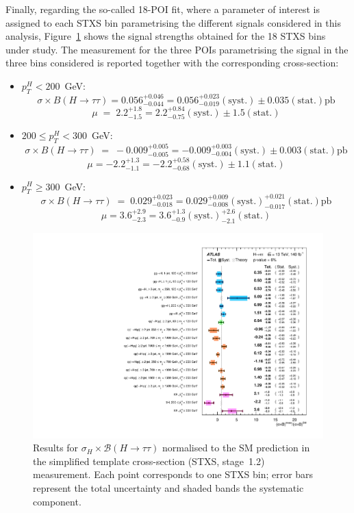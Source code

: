 Finally, regarding the so-called 18-POI fit, where a parameter of interest is assigned to each STXS bin parametrising the different signals considered in this \htautau analysis, Figure~\ref{fig:stxs_mu} shows the signal strengths obtained for the 18 STXS bins under study. The measurement for the three POIs parametrising the \ttH signal in the three \pth bins considered is reported together with the corresponding cross-section:
\begin{itemize}
  \small
  \item $p_{T}^{H} < 200$~GeV:  
  \[
  \sigma \times B(H \to \tau\tau)=0.056^{+0.046}_{-0.044} 
  = 0.056^{+0.023}_{-0.019}(\text{syst.})\pm 0.035(\text{stat.})\text{pb}
  \]
  \[
  \mu \;=\; 2.2^{+1.8}_{-1.5}=2.2^{+0.84}_{-0.75}(\text{syst.})\pm 1.5(\text{stat.})
  \]
  \item $200 \leq p_{T}^{H} < 300$~GeV:  
  \[
  \sigma \times B(H \to \tau\tau) \;=\; -0.009^{+0.005}_{-0.005} 
  = -0.009^{+0.003}_{-0.004}(\text{syst.})\pm 0.003(\text{stat.}) \text{pb}
  \]
  \[
  \mu=-2.2^{+1.3}_{-1.1}=-2.2^{+0.58}_{-0.68}(\text{syst.})\pm 1.1(\text{stat.})
  \]
  \item $p_{T}^{H} \geq 300$~GeV:  
  \[
  \sigma \times B(H \to \tau\tau) \;=\; 0.029^{+0.023}_{-0.018} 
  = 0.029^{+0.009}_{-0.008}(\text{syst.})^{+0.021}_{-0.017}(\text{stat.})\text{pb}
  \]
  \[
  \mu=3.6^{+2.9}_{-2.3}=3.6^{+1.3}_{-0.9}(\text{syst.})^{+2.6}_{-2.1}(\text{stat.})
  \]
\end{itemize}

\begin{figure}[htbp]
  \centering
  \includegraphics[width=0.92\linewidth]{images/fit_stxs/fig_06.pdf} %
  \caption{Results for \(\sigma_H \times \mathcal{B}(H\!\to\!\tau\tau)\) normalised to the SM prediction
  in the simplified template cross-section (STXS, stage~1.2) measurement.
  Each point corresponds to one STXS bin; error bars represent the total uncertainty and shaded bands the systematic component.}
  \label{fig:stxs_mu}
\end{figure}

